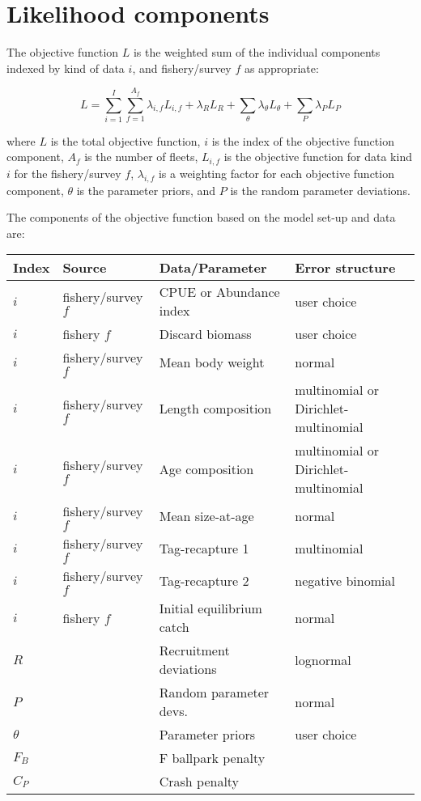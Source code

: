 \section{Likelihood components}

The objective function $L$ is the weighted sum of the individual components
indexed by kind of data $i$, and fishery/survey $f$ as appropriate:

\begin{equation}
	L = \sum_{i=1}^{I}\sum_{f=1}^{A_f}\lambda_{i,f} L_{i,f}+\lambda_R L_R + \sum_{\theta}^{}\lambda_\theta L_\theta + \sum_{P}^{}\lambda_P L_P
\end{equation}

where $L$ is the total objective function, $i$ is the index of the objective
function component, $A_f$ is the number of fleets, $L_{i,f}$ is the
objective function for data kind $i$ for the fishery/survey $f$,
$\lambda_{i,f}$ is a weighting factor for each objective function component,
$\theta$ is the parameter priors, and $P$ is the random parameter deviations.

The components of the objective function based on the model set-up and data are: 

\begin{longtable}{p{1cm} p{3.5cm} p{5.5cm} p{5cm}}
	\hline
	Index & Source & Data/Parameter & Error structure\Tstrut\Bstrut\\
	\hline	
	$i$ & fishery/survey $f$ & CPUE or Abundance index & user choice \Tstrut\\
	$i$ & fishery $f$        & Discard biomass         & user choice \Tstrut\\
	$i$ & fishery/survey $f$ & Mean body weight        & normal \Tstrut\\
	$i$ & fishery/survey $f$ & Length composition      & multinomial or Dirichlet-multinomial\Tstrut\\
	$i$ & fishery/survey $f$ & Age composition         & multinomial or Dirichlet-multinomial\Tstrut\\
	$i$ & fishery/survey $f$ & Mean size-at-age        & normal \Tstrut\\
	$i$ & fishery/survey $f$ & Tag-recapture 1         & multinomial \Tstrut\\
	$i$ & fishery/survey $f$ & Tag-recapture 2         & negative binomial\Tstrut\\
	$i$ & fishery $f$        & Initial equilibrium catch & normal \Tstrut\\
	$R$ & 					 & Recruitment deviations  & lognormal \Tstrut\\
	$P$ & 					 & Random parameter devs.  & normal \Tstrut\\
	$\theta$ & 				 & Parameter priors	       & user choice\Tstrut\\
	$F_B$ & 				 & F ballpark penalty	   &  \Tstrut\\
	$C_P$ &				     & Crash penalty           &  \Tstrut\Bstrut\\
	\hline
\end{longtable}

